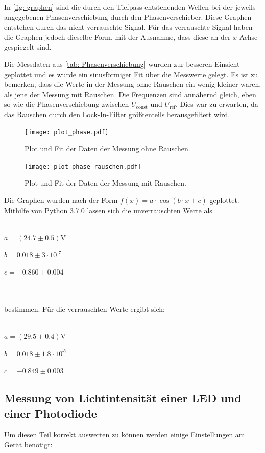 In \autoref{fig: graphen} sind die durch den Tiefpass entstehenden Wellen bei der jeweils angegebenen Phasenverschiebung durch den Phasenverschieber. Diese Graphen entstehen durch das nicht verrauschte Signal.
Für das verrauschte Signal haben die Graphen jedoch dieselbe Form, mit der Ausnahme, dass diese an der $x$-Achse gespiegelt sind.

Die Messdaten aus \autoref{tab: Phasenverschiebung} wurden zur besseren Einsicht geplottet und es wurde ein sinusförmiger Fit über die Messwerte gelegt.
Es ist zu bemerken, dass die Werte in der Messung ohne Rauschen ein wenig kleiner waren, als jene der Messung mit Rauschen.
Die Frequenzen sind annähernd gleich, eben so wie die Phasenverschiebung zwischen $U_\text{const}$ und $U_\text{ref}$. Dies war zu erwarten, da das Rauschen durch den Lock-In-Filter größtenteils herausgefiltert wird.

\begin{figure}
  \centering
  \texttt{[image: plot\_phase.pdf]}
  \caption{Plot und Fit der Daten der Messung ohne Rauschen.}
  \label{fig:plot_phase}
\end{figure}

\begin{figure}
  \centering
  \texttt{[image: plot\_phase\_rauschen.pdf]}
  \caption{Plot und Fit der Daten der Messung mit Rauschen.}
  \label{fig:plot_phase_rauschen}
\end{figure}

Die Graphen wurden nach der Form $f(x)=a\cdot \cos(b\cdot x+c)$ geplottet. Mithilfe von Python 3.7.0 lassen sich die unverrauschten Werte als
\\ \\
\centerline{$a=(24.7 \pm 0.5)$V}
\centerline{$b=0.018 \pm 3\cdot 10^\text{-7}$}
\centerline{$c=-0.860 \pm 0.004$}
\\ \\
bestimmen. Für die verrauschten Werte ergibt sich:
\\ \\
\centerline{$a=(29.5 \pm 0.4)$V}
\centerline{$b=0.018 \pm 1.8\cdot 10^\text{-7}$}
\centerline{$c=-0.849 \pm 0.003$}

\newpage
\subsection{Messung von Lichtintensität einer LED und einer Photodiode}

Um diesen Teil korrekt auswerten zu können werden einige Einstellungen am Gerät benötigt:

